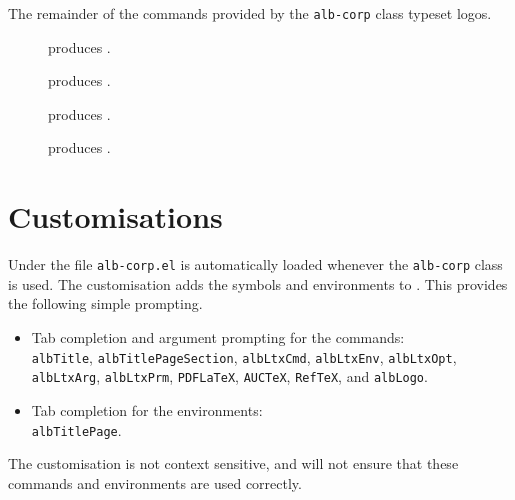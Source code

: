 \documentclass[11pt,a4paper,oneside,titlepage]{alb-corp}
\begin{document}
The remainder of the commands provided by the \texttt{alb-corp} class
typeset logos.

\begin{description}
\item[] produces \PDFLaTeX{}.

\item[] produces \AUCTeX{}.

\item[] produces \RefTeX{}.

\item[] produces \albLogo{}.
\end{description}




\section{\AUCTeX{} Customisations}
\label{sec:alb-corp-layout-documentation:auctex-cust}

Under \AUCTeX{} the file \texttt{alb-corp.el} is automatically loaded
whenever the \texttt{alb-corp} class is used.  The customisation adds
the symbols and environments to \AUCTeX{}.  This provides the following
simple prompting.
\begin{itemize}
\item
  \begin{flushleft}
    Tab completion and argument prompting for the commands:\\
    \texttt{albTitle}, \texttt{albTitlePageSection}, \texttt{albLtxCmd},
    \texttt{albLtxEnv}, \texttt{albLtxOpt}, \texttt{albLtxArg},
    \texttt{albLtxPrm}, \texttt{PDFLaTeX}, \texttt{AUCTeX},
    \texttt{RefTeX}, and \texttt{albLogo}.
  \end{flushleft}

\item
  \begin{flushleft}
    Tab completion for the environments:\\
    \texttt{albTitlePage}.
  \end{flushleft}
\end{itemize}
The customisation is not context sensitive, and will not ensure that
these commands and environments are used correctly.
\end{document}
